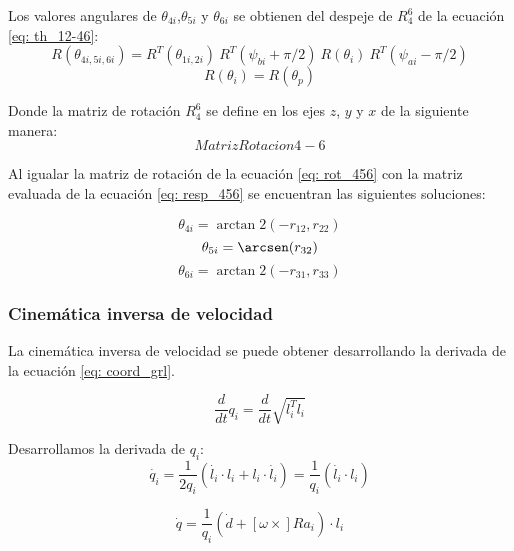 Los valores angulares de $\theta_{4i}$,$\theta_{5i}$ y $\theta_{6i}$ se obtienen del despeje de $R_4^6$ de la ecuación \ref{eq: th_12-46}:
\begin{equation}\label{eq: resp_456}
R(\theta_{4i,5i,6i})= R^T(\theta_{1i,2i})\ R^T(\psi_{bi}+\pi/2)\ R(\theta_i)\ R^T(\psi_{ai}-\pi/2)
\end{equation}
\begin{equation*}
R(\theta_i) = R(\theta_p)
\end{equation*}

Donde la matriz de rotación $R_4^6$ se define en los ejes $z$, $y$ y $x$ de la siguiente manera:
\begin{equation}\label{eq: rot_456}
Matriz Rotacion 4-6
\end{equation}

Al igualar la matriz de rotación de la ecuación \ref{eq: rot_456} con la matriz evaluada de la ecuación \ref{eq: resp_456} se encuentran las siguientes soluciones:

\begin{equation}
\theta_{4i} = \arctan2 (-r_{12},r_{22})
\end{equation}
\begin{equation}
\theta_{5i} = \arcsen (r_{32})
\end{equation}
\begin{equation}
\theta_{6i} = \arctan2 (-r_{31},r_{33})
\end{equation}

\subsubsection{Cinemática inversa de velocidad}
La cinemática inversa de velocidad se puede obtener desarrollando la derivada de la ecuación \ref{eq: coord_grl}.

\begin{equation}
\frac{d}{dt}q_i = \frac{d}{dt}\sqrt{l_i^Tl_i} 
\end{equation}


Desarrollamos la derivada de $q_i$:
\begin{equation}
\dot{q_i} = \frac{1}{2q_i} (\dot{l_i} \cdot l_i + l_i \cdot \dot{l_i}) = \frac{1}{q_i} (\dot{l_i} \cdot l_i)
\end{equation}

\begin{equation}
\dot{q}=\frac{1}{q_i}(\dot{d} + [\omega \times] Ra_i)\cdot l_i 
\end{equation}


